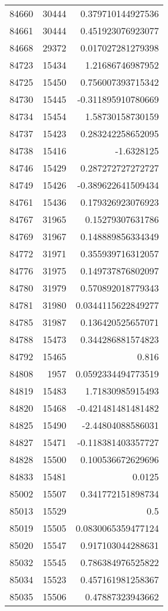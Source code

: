 \begin{tabular}{r | r | r}
84660 & 30444 & 0.379710144927536 \\
84661 & 30444 & 0.451923076923077 \\
84668 & 29372 & 0.017027281279398 \\
84723 & 15434 & 1.21686746987952 \\
84725 & 15450 & 0.756007393715342 \\
84730 & 15445 & -0.311895910780669 \\
84734 & 15454 & 1.58730158730159 \\
84737 & 15423 & 0.283242258652095 \\
84738 & 15416 & -1.6328125 \\
84746 & 15429 & 0.287272727272727 \\
84749 & 15426 & -0.389622641509434 \\
84761 & 15436 & 0.179326923076923 \\
84767 & 31965 & 0.15279307631786 \\
84769 & 31967 & 0.148889856334349 \\
84772 & 31971 & 0.355939716312057 \\
84776 & 31975 & 0.149737876802097 \\
84780 & 31979 & 0.570892018779343 \\
84781 & 31980 & 0.0344115622849277 \\
84785 & 31987 & 0.136420525657071 \\
84788 & 15473 & 0.344286881574823 \\
84792 & 15465 & 0.816 \\
84808 & 1957 & 0.0592334494773519 \\
84819 & 15483 & 1.71830985915493 \\
84820 & 15468 & -0.421481481481482 \\
84825 & 15490 & -2.44804088586031 \\
84827 & 15471 & -0.118381403357727 \\
84828 & 15500 & 0.100536672629696 \\
84833 & 15481 & 0.0125 \\
85002 & 15507 & 0.341772151898734 \\
85013 & 15529 & 0.5 \\
85019 & 15505 & 0.0830065359477124 \\
85020 & 15547 & 0.917103044288631 \\
85032 & 15545 & 0.786384976525822 \\
85034 & 15523 & 0.457161981258367 \\
85035 & 15506 & 0.47887323943662 \\

\end{tabular}
